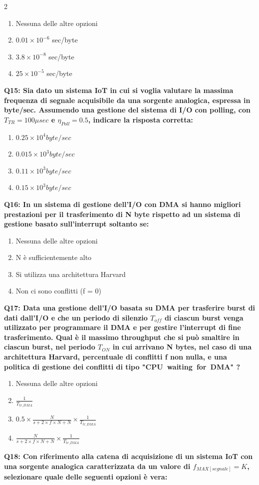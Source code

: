 \documentclass[10pt]{article}
\begin{document}
\begin{multicols}{2}
\begin{enumerate}[label=\arabic*.]
\item Nessuna delle altre opzioni
\item $0.01\times10^{-6}$ sec/byte
\item $3.8\times10^{-8}$ sec/byte
\item $25\times10^{-5}$ sec/byte
\end{enumerate}
\textbf{Q15: Sia dato un sistema IoT in cui si voglia valutare la massima frequenza di segnale acquisibile da una sorgente analogica, espressa in byte/sec. Assumendo una gestione del sistema di I/O con polling, con $T_{TR}=100\mu sec$ e $\eta_{Poll}=0.5$, indicare la risposta corretta:}

\begin{enumerate}[label=\arabic*.]
\item $0.25\times10^4 byte/sec$
\item $0.015\times10^3 byte/sec$
\item $0.11\times10^3 byte/sec$
\item $0.15\times10^3 byte/sec$
\end{enumerate}
\textbf{Q16: In un sistema di gestione dell’I/O con DMA si hanno migliori prestazioni per il trasferimento di N byte rispetto ad un sistema di gestione basato sull’interrupt soltanto se:}

\begin{enumerate}[label=\arabic*.]
\item Nessuna delle altre opzioni
\item N è sufficientemente alto
\item Si utilizza una architettura Harvard
\item Non ci sono conflitti (f = 0)
\end{enumerate}
\textbf{Q17: Data una gestione dell’I/O basata su DMA per trasferire burst di dati dall’I/O e che un periodo di silenzio $T_{off}$ di ciascun burst venga utilizzato per programmare il DMA e per gestire l’interrupt di fine trasferimento. Qual è il massimo throughput che si può smaltire in ciascun burst, nel periodo $T_{ON}$ in cui arrivano N bytes, nel caso di una architettura Harvard, percentuale di conflitti f non nulla, e una politica di gestione dei conflitti di tipo "CPU waiting for DMA" ?}

\begin{enumerate}[label=\arabic*.]
\item Nessuna delle altre opzioni
\item $\frac{1}{T_{tr\_DMA}}$
\item $0.5 \times \frac{N}{s+ 2 \times f \times N + N} \times \frac{1}{T_{tr\_DMA}} $
\item $\frac{N}{s+ 2 \times f \times N + N} \times \frac{1}{T_{tr\_DMA}} $
\end{enumerate}
\textbf{Q18: Con riferimento alla catena di acquisizione di un sistema IoT con una sorgente analogica caratterizzata da un valore di $f_{MAX[segnale]} = K$, selezionare quale delle seguenti opzioni è vera:}


\end{multicols}
\end{document}
